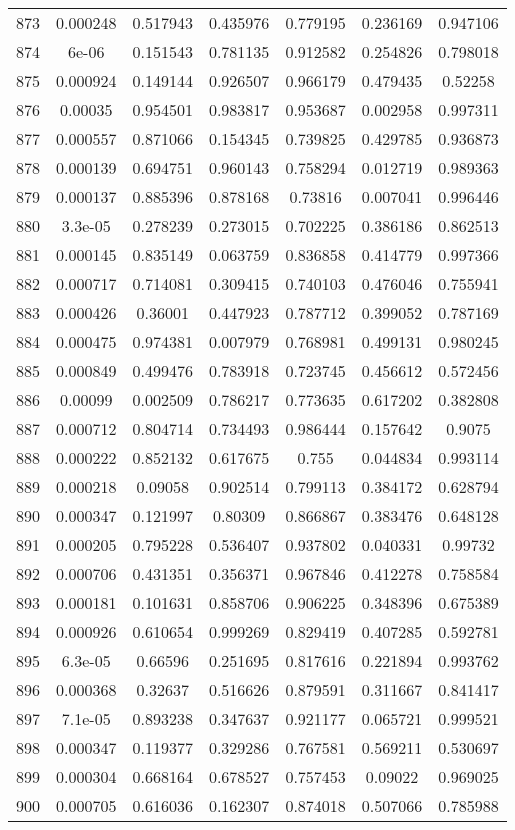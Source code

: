 \begin{table}
\begin{tabular}{c|c|c|c|c|c|c}
873 & 0.000248 & 0.517943 & 0.435976 & 0.779195 & 0.236169 & 0.947106\\
874 & 6e-06 & 0.151543 & 0.781135 & 0.912582 & 0.254826 & 0.798018\\
875 & 0.000924 & 0.149144 & 0.926507 & 0.966179 & 0.479435 & 0.52258\\
876 & 0.00035 & 0.954501 & 0.983817 & 0.953687 & 0.002958 & 0.997311\\
877 & 0.000557 & 0.871066 & 0.154345 & 0.739825 & 0.429785 & 0.936873\\
878 & 0.000139 & 0.694751 & 0.960143 & 0.758294 & 0.012719 & 0.989363\\
879 & 0.000137 & 0.885396 & 0.878168 & 0.73816 & 0.007041 & 0.996446\\
880 & 3.3e-05 & 0.278239 & 0.273015 & 0.702225 & 0.386186 & 0.862513\\
881 & 0.000145 & 0.835149 & 0.063759 & 0.836858 & 0.414779 & 0.997366\\
882 & 0.000717 & 0.714081 & 0.309415 & 0.740103 & 0.476046 & 0.755941\\
883 & 0.000426 & 0.36001 & 0.447923 & 0.787712 & 0.399052 & 0.787169\\
884 & 0.000475 & 0.974381 & 0.007979 & 0.768981 & 0.499131 & 0.980245\\
885 & 0.000849 & 0.499476 & 0.783918 & 0.723745 & 0.456612 & 0.572456\\
886 & 0.00099 & 0.002509 & 0.786217 & 0.773635 & 0.617202 & 0.382808\\
887 & 0.000712 & 0.804714 & 0.734493 & 0.986444 & 0.157642 & 0.9075\\
888 & 0.000222 & 0.852132 & 0.617675 & 0.755 & 0.044834 & 0.993114\\
889 & 0.000218 & 0.09058 & 0.902514 & 0.799113 & 0.384172 & 0.628794\\
890 & 0.000347 & 0.121997 & 0.80309 & 0.866867 & 0.383476 & 0.648128\\
891 & 0.000205 & 0.795228 & 0.536407 & 0.937802 & 0.040331 & 0.99732\\
892 & 0.000706 & 0.431351 & 0.356371 & 0.967846 & 0.412278 & 0.758584\\
893 & 0.000181 & 0.101631 & 0.858706 & 0.906225 & 0.348396 & 0.675389\\
894 & 0.000926 & 0.610654 & 0.999269 & 0.829419 & 0.407285 & 0.592781\\
895 & 6.3e-05 & 0.66596 & 0.251695 & 0.817616 & 0.221894 & 0.993762\\
896 & 0.000368 & 0.32637 & 0.516626 & 0.879591 & 0.311667 & 0.841417\\
897 & 7.1e-05 & 0.893238 & 0.347637 & 0.921177 & 0.065721 & 0.999521\\
898 & 0.000347 & 0.119377 & 0.329286 & 0.767581 & 0.569211 & 0.530697\\
899 & 0.000304 & 0.668164 & 0.678527 & 0.757453 & 0.09022 & 0.969025\\
900 & 0.000705 & 0.616036 & 0.162307 & 0.874018 & 0.507066 & 0.785988\\
\end{tabular}
\end{table}
